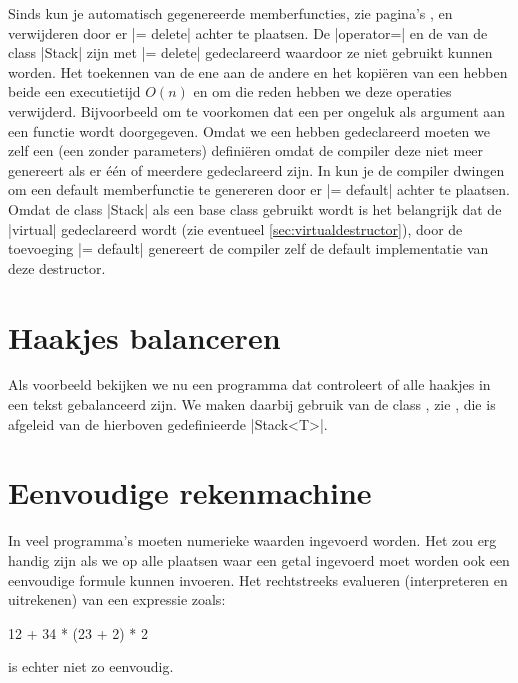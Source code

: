\begin{cpplstShortInline}
Sinds \Cpp{} kun je automatisch gegenereerde memberfuncties, zie pagina's \pageref{defaultconstructor}, \pageref{sec:defaultcopyconstructor} en \pageref{sec:defaultassignmentoperator} verwijderen door er |= delete| achter te plaatsen.
De |operator=| en de  van de class |Stack| zijn met |= delete| gedeclareerd waardoor ze niet gebruikt kunnen worden.
Het toekennen van de ene  aan de andere en het kopiëren van een  hebben beide een executietijd $O(n)$ en om die reden hebben we deze operaties verwijderd.
Bijvoorbeeld om te voorkomen dat een  per ongeluk als  argument aan een functie wordt doorgegeven.
Omdat we een  hebben gedeclareerd moeten we zelf een  (een  zonder parameters) definiëren omdat de compiler deze niet meer genereert als er één of meerdere  gedeclareerd zijn.
In \Cpp{} kun je de compiler dwingen om een default memberfunctie te genereren door er |= default| achter te plaatsen.
Omdat de class |Stack| als een base class gebruikt wordt is het belangrijk dat de  |virtual| gedeclareerd wordt (zie eventueel \cref{sec:virtualdestructor}), door de toevoeging |= default| genereert de compiler zelf de default implementatie van deze destructor.

\section{Haakjes balanceren}
\label{sec:balance}
Als voorbeeld bekijken we nu een \Cpp{} programma  dat controleert of alle haakjes in een tekst gebalanceerd zijn.
We maken daarbij gebruik van de class , zie , die is afgeleid van de hierboven gedefinieerde |Stack<T>|.


\section{Eenvoudige rekenmachine}
In veel programma's moeten numerieke waarden ingevoerd worden.
Het zou erg handig zijn als we op alle plaatsen waar een getal ingevoerd moet worden ook een eenvoudige formule kunnen invoeren.
Het rechtstreeks evalueren (interpreteren en uitrekenen) van een expressie zoals:
\begin{coutput}
12 + 34 * (23 + 2) * 2
\end{coutput}
is echter niet zo eenvoudig.


\end{cpplstShortInline}
